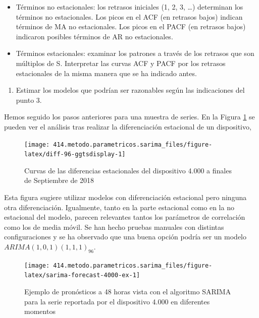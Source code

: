 \documentclass[]{book}
\providecommand{\tightlist}{%
  \setlength{\itemsep}{0pt}\setlength{\parskip}{0pt}}
\begin{document}
\begin{itemize}
\tightlist
\item
  Términos no estacionales: los retrasos iniciales (1, 2, 3, \ldots{})
  determinan los términos no estacionales. Los picos en el ACF (en
  retrasos bajos) indican términos de MA no estacionales. Los picos en
  el PACF (en retrasos bajos) indicaron posibles términos de AR no
  estacionales.
\item
  Términos estacionales: examinar los patrones a través de los retrasos
  que son múltiplos de S. Interpretar las curvas ACF y PACF por los
  retrasos estacionales de la misma manera que se ha indicado antes.
\end{itemize}

\begin{enumerate}
\def\labelenumi{\arabic{enumi}.}
\setcounter{enumi}{3}
\tightlist
\item
  Estimar los modelos que podrían ser razonables según las indicaciones
  del punto 3.
\end{enumerate}

Hemos seguido los pasos anteriores para una muestra de series. En la
Figura \ref{fig:diff-96-ggtsdisplay} se pueden ver el análisis tras
realizar la diferenciación estacional de un dispositivo,

\begin{figure}[H]

{\centering \texttt{[image: 414.metodo.parametricos.sarima\_files/figure-latex/diff-96-ggtsdisplay-1]} 

}

\caption{Curvas de las diferencias estacionales del dispositivo 4.000 a finales de Septiembre de 2018}\label{fig:diff-96-ggtsdisplay}
\end{figure}

Esta figura sugiere utilizar modelos con diferenciación estacional pero
ninguna otra diferenciación. Igualmente, tanto en la parte estacional
como en la no estacional del modelo, parecen relevantes tantos los
parámetros de correlación como los de media móvil. Se han hecho pruebas
manuales con distintas configuraciones y se ha observado que una buena
opción podría ser un modelo \(ARIMA(1,0,1)(1,1,1)_{96}\).

\begin{figure}[H]

{\centering \texttt{[image: 414.metodo.parametricos.sarima\_files/figure-latex/sarima-forecast-4000-ex-1]} 

}

\caption{Ejemplo de pronósticos a 48 horas vista con el algoritmo SARIMA para la serie reportada por el dispositivo 4.000 en diferentes momentos}\label{fig:sarima-forecast-4000-ex}
\end{figure}
\end{document}
